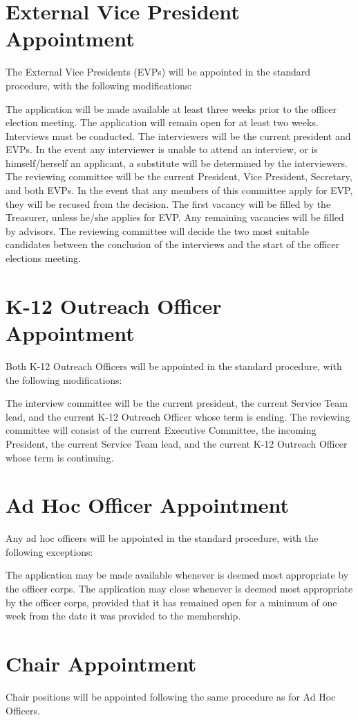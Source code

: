 \section{External Vice President Appointment} The External Vice Presidents (EVPs) will be appointed in the standard procedure, with the following modifications:
\begin{enumsubsection}
\itemnotoc The application will be made available at least three weeks prior to the officer election meeting.
\itemnotoc The application will remain open for at least two weeks.
\itemnotoc Interviews must be conducted. The interviewers will be the current president and EVPs. In the event any interviewer is unable to attend an interview, or is himself/herself an applicant, a substitute will be determined by the interviewers. 
\itemnotoc The reviewing committee will be the current President, Vice President, Secretary, and both EVPs. In the event that any members of this committee apply for EVP, they will be recused from the decision. The first vacancy will be filled by the Treasurer, unless he/she applies for EVP. Any remaining vacancies will be filled by advisors. 
\itemnotoc The reviewing committee will decide the two most suitable candidates between the conclusion of the interviews and the start of the officer elections meeting.
\end{enumsubsection}
\section{K-12 Outreach Officer Appointment} Both K-12 Outreach Officers will be appointed in the standard procedure, with the following modifications:
\begin{enumsubsection}
\itemnotoc The interview committee will be the current president, the current Service Team lead, and the current K-12 Outreach Officer whose term is ending.
\itemnotoc The reviewing committee will consist of the current Executive Committee, the incoming President, the current Service Team lead, and the current K-12 Outreach Officer whose term is continuing.
\end{enumsubsection}
\section{Ad Hoc Officer Appointment} Any ad hoc officers will be appointed in the standard procedure, with the following exceptions:
\begin{enumsubsection}
\itemnotoc The application may be made available whenever is deemed most appropriate by the officer corps.
\itemnotoc The application may close whenever is deemed most appropriate by the officer corps, provided that it has remained open for a minimum of one week from the date it was provided to the membership.
\end{enumsubsection}
\section{Chair Appointment} Chair positions will be appointed following the same procedure as for Ad Hoc Officers.